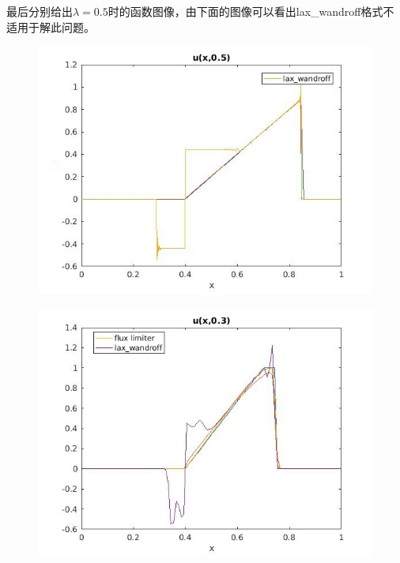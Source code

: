 \documentclass[12pt]{article}
\theoremstyle{remark}
\begin{document}
最后分别给出$\lambda=0.5$时的函数图像，由下面的图像可以看出lax\_wandroff格式不适用于解此问题。
\begin{figure}[!ht]
\centering
\includegraphics[width=350pt]{pde_3.jpg}
\end{figure}
\begin{figure}[!ht]
\centering
\includegraphics[width=350pt]{pde_4.jpg}
\end{figure}
\end{document}
